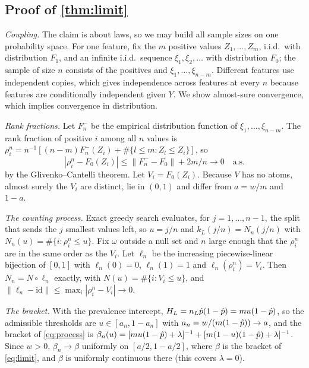 \subsection{Proof of \texorpdfstring{\cref{thm:limit}}{Theorem 1}}\label{app:proof-limit}

\emph{Coupling.} The claim is about laws, so we may build all sample sizes on one probability space. For one feature, fix the $m$ positive values $Z_1,\dots,Z_m$, i.i.d.\ with distribution $F_1$, and an infinite i.i.d.\ sequence $\xi_1, \xi_2, \dots$ with distribution $F_0$; the sample of size $n$ consists of the positives and $\xi_1, \dots, \xi_{n-m}$. Different features use independent copies, which gives independence across features at every $n$ because features are conditionally independent given $Y$. We show almost-sure convergence, which implies convergence in distribution.

\emph{Rank fractions.} Let $F^-_n$ be the empirical distribution function of $\xi_1,\dots,\xi_{n-m}$. The rank fraction of positive $i$ among all $n$ values is $\rho_i^n = n^{-1}[(n-m)F^-_n(Z_i) + \#\{l \le m : Z_l \le Z_i\}]$, so
\[
  |\rho^n_i - F_0(Z_i)| \le \|F^-_n - F_0\| + 2m/n \to 0 \quad\text{a.s.}
\]
by the Glivenko--Cantelli theorem. Let $V_i = F_0(Z_i)$. Because $V$ has no atoms, almost surely the $V_i$ are distinct, lie in $(0,1)$ and differ from $a = w/m$ and $1-a$.

\emph{The counting process.} Exact greedy search evaluates, for $j = 1,\dots,n-1$, the split that sends the $j$ smallest values left, so $u = j/n$ and $k_L(j/n) = N_n(j/n)$ with $N_n(u) = \#\{i : \rho_i^n \le u\}$. Fix $\omega$ outside a null set and $n$ large enough that the $\rho^n_i$ are in the same order as the $V_i$. Let $\ell_n$ be the increasing piecewise-linear bijection of $[0,1]$ with $\ell_n(0) = 0$, $\ell_n(1) = 1$ and $\ell_n(\rho^n_i) = V_i$. Then $N_n = N\circ\ell_n$ exactly, with $N(u) = \#\{i : V_i \le u\}$, and $\|\ell_n - \mathrm{id}\| \le \max_i|\rho^n_i - V_i| \to 0$.

\emph{The bracket.} With the prevalence intercept, $H_L = n_L\hat p(1-\hat p) = mu(1-\hat p)$, so the admissible thresholds are $u \in [a_n, 1-a_n]$ with $a_n = w/(m(1-\hat p)) \to a$, and the bracket of \eqref{eq:process} is $\beta_n(u) = [mu(1-\hat p)+\lambda]^{-1} + [m(1-u)(1-\hat p)+\lambda]^{-1}$. Since $w > 0$, $\beta_n \to \beta$ uniformly on $[a/2, 1-a/2]$, where $\beta$ is the bracket of \eqref{eq:limit}, and $\beta$ is uniformly continuous there (this covers $\lambda = 0$).

